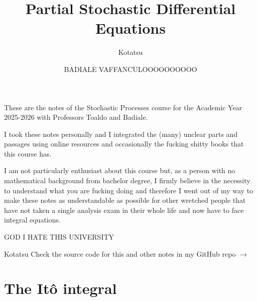 \documentclass[12pt]{report}
\begin{document}
	\title{Partial Stochastic Differential Equations}
	\author{Kotatsu}
	\date{\small BADIALE VAFFANCULOOOOOOOOOO}
	\maketitle
	\begin{preface}
		These are the notes of the Stochastic Processes course for the Academic Year 2025-2026 with Professors Toaldo and Badiale.\par
		I took these notes personally and I integrated the (many) unclear parts and passages using online resources and occasionally the fucking shitty books that this course has. \par
		I am not particularly enthusiast about this course but, as a person with no mathematical background from bachelor degree, I firmly believe in the necessity to understand what you are fucking doing and therefore I went out of my way to make these notes as understandable as possible for other wretched people that have not taken a single analysis exam in their whole life and now have to face integral equations. 
		
		GOD I HATE THIS UNIVERSITY
		\vskip1.2cm
		
		\hfill Kotatsu
		\vskip1.2cm
		Check the source code for this and other notes in my GitHub repo $\to$ \href{https://github.com/godblessourdeadkotatsu/lecture-notes-2024-25/tree/main/PSDE}{\faGithubSquare}
	\end{preface}
	\clearpage
	\tableofcontents
\chapter{The Itô integral}	
\end{document}
